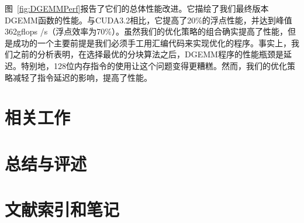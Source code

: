 \begin{flushleft}
图~\ref{fig:DGEMMPerf}报告了它们的总体性能改进。它描绘了我们最终版本DGEMM函数的性能。与CUDA3.2相比，它提高了20\%的浮点性能，并达到峰值362gflops /s（浮点效率为70\%）。虽然我们的优化策略的组合确实提高了性能，但是成功的一个主要前提是我们必须手工用汇编代码来实现优化的程序。事实上，我们之前的分析表明，在选择最优的分块算法之后，DGEMM程序的性能瓶颈是延迟。特别地，128位内存指令的使用让这个问题变得更糟糕。然而，我们的优化策略减轻了指令延迟的影响，提高了性能。

\section{相关工作}

\section{总结与评述}

\section{文献索引和笔记}

\end{flushleft}